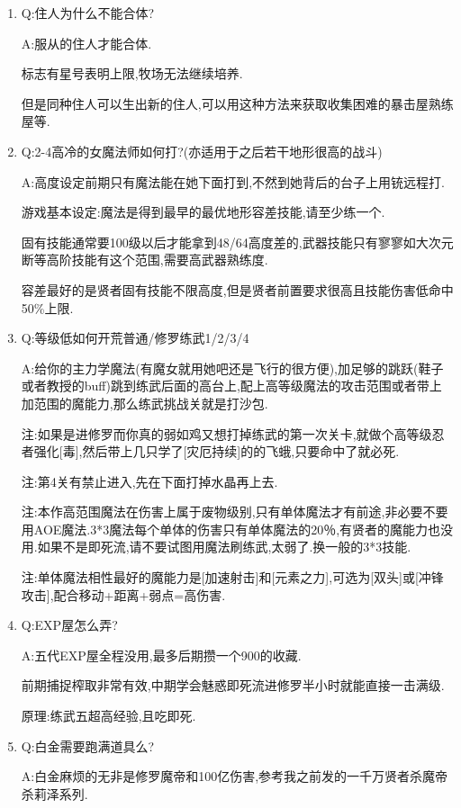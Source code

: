 \begin{enumerate}

	\item
	Q:住人为什么不能合体?

	A:服从的住人才能合体.

	标志有星号表明上限,牧场无法继续培养.

	但是同种住人可以生出新的住人,可以用这种方法来获取收集困难的暴击屋熟练屋等.

	\item
	Q:2-4高冷的女魔法师如何打?(亦适用于之后若干地形很高的战斗)

	A:高度设定前期只有魔法能在她下面打到,不然到她背后的台子上用铳远程打.

	游戏基本设定:魔法是得到最早的最优地形容差技能,请至少练一个.

	固有技能通常要100级以后才能拿到48/64高度差的,武器技能只有寥寥如大次元断等高阶技能有这个范围,需要高武器熟练度.

	容差最好的是贤者固有技能不限高度,但是贤者前置要求很高且技能伤害低命中50\%上限.

	\item
	Q:等级低如何开荒普通/修罗练武1/2/3/4

	A:给你的主力学魔法(有魔女就用她吧还是飞行的很方便),加足够的跳跃(鞋子或者教授的buff)跳到练武后面的高台上,配上高等级魔法的攻击范围或者带上加范围的魔能力,那么练武挑战关就是打沙包.

	注:如果是进修罗而你真的弱如鸡又想打掉练武的第一次关卡,就做个高等级忍者强化[毒],然后带上几只学了[灾厄持续]的的飞蛾,只要命中了就必死.

	注:第4关有禁止进入,先在下面打掉水晶再上去.

	注:本作高范围魔法在伤害上属于废物级别,只有单体魔法才有前途,非必要不要用AOE魔法.3*3魔法每个单体的伤害只有单体魔法的20％,有贤者的魔能力也没用.如果不是即死流,请不要试图用魔法刷练武,太弱了.换一般的3*3技能.

	注:单体魔法相性最好的魔能力是[加速射击]和[元素之力],可选为[双头]或[冲锋攻击],配合移动+距离+弱点=高伤害.

	\item
	Q:EXP屋怎么弄?

	A:五代EXP屋全程没用,最多后期攒一个900的收藏.

	前期捕捉榨取非常有效,中期学会魅惑即死流进修罗半小时就能直接一击满级.

	原理:练武五超高经验,且吃即死.

	\item 
	Q:白金需要跑满道具么?

	A:白金麻烦的无非是修罗魔帝和100亿伤害,参考我之前发的一千万贤者杀魔帝杀莉泽系列.


\end{enumerate}
